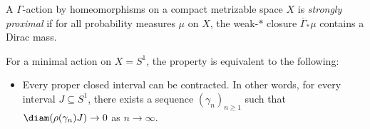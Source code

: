 \documentclass[a4paper]{article}
\begin{document}
\begin{defi}
  A $\Gamma$-action by homeomorphisms on a compact metrizable space $X$ is \emph{strongly proximal} if for all probability measures $\mu$ on $X$, the weak-$*$ closure $\overline{\Gamma}_* \mu$ contains a Dirac mass.
\end{defi}

For a minimal action on $X = S^1$, the property is equivalent to the following:
\begin{itemize}
  \item Every proper closed interval can be contracted. In other words, for every interval $J \subseteq S^1$, there exists a sequence $(\gamma_n)_{n \geq 1}$ such that $\diam(\rho(\gamma_n)J) \to 0$ as $n \to \infty$.
\end{itemize}
\end{document}
